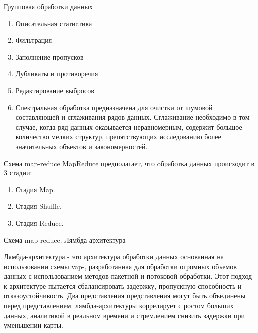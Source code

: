 \documentclass{beamer}
\begin{document}
\begin{frame}{Групповая обработки данных} 
\begin{enumerate}
\item Описательная статиcтика 
\item Фильтрация 
\item Заполнение пропусков
\item Дубликаты и противоречия
\item Редактирование выбросов  
\item Спектральная обработка предназначена для очистки от шумовой составляющей и сглаживания рядов данных. Сглаживание необходимо в том случае, когда ряд данных оказывается неравномерным, содержит большое количество мелких структур, препятствующих исследованию более значительных объектов и закономерностей. 


\end{enumerate}




\end{frame}




\begin{frame}{Схема map-reduce} 
MapReduce предполагает, что oбработка данных происходит в 3 стадии:
\begin{enumerate}

\item  Стадия Map.
\item   Стадия Shuffle.
\item   Стадия Reduce.
\end{enumerate}

\end{frame}

\begin{frame}{Схема map-reduce. Лямбда-архитектура  } 

Лямбда-архитектура - это архитектура обработки данных основанная на  использовании схемы vap-, разработанная для обработки огромных объемов данных с использованием методов пакетной и потоковой обработки.
 Этот подход к архитектуре пытается сбалансировать задержку, пропускную способность и отказоустойчивость. Два представления представления могут быть объединены перед представлением. лямбда-архитектуры коррелирует с ростом больших данных, аналитикой в реальном времени и стремлением снизить задержки при уменьшении карты.

\end{frame}
\end{document}
